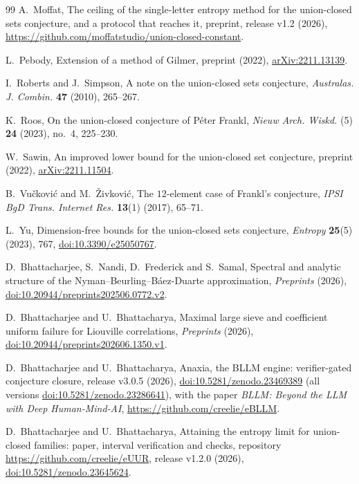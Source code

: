 \documentclass[aps,prd,twocolumn,superscriptaddress,nofootinbib,longbibliography,floatfix,amsmath,amssymb,10pt]{revtex4-2}
\theoremstyle{plain}
\theoremstyle{definition}
\theoremstyle{plain}
\begin{document}
\begin{thebibliography}{99}
 A.~Moffat, The ceiling of the single-letter entropy method for the union-closed sets conjecture, and a protocol that reaches it, preprint, release v1.2 (2026), \url{https://github.com/moffatstudio/union-closed-constant}.

 L.~Pebody, Extension of a method of Gilmer, preprint (2022), \href{https://arxiv.org/abs/2211.13139}{arXiv:2211.13139}.

 I.~Roberts and J.~Simpson, A note on the union-closed sets conjecture, \emph{Australas. J. Combin.} \textbf{47} (2010), 265--267.

 K.~Roos, On the union-closed conjecture of P\'eter Frankl, \emph{Nieuw Arch. Wiskd.} (5) \textbf{24} (2023), no.~4, 225--230.

 W.~Sawin, An improved lower bound for the union-closed set conjecture, preprint (2022), \href{https://arxiv.org/abs/2211.11504}{arXiv:2211.11504}.

 B.~Vu\v{c}kovi\'c and M.~\v{Z}ivkovi\'c, The $12$-element case of Frankl's conjecture, \emph{IPSI BgD Trans. Internet Res.} \textbf{13}(1) (2017), 65--71.

 L.~Yu, Dimension-free bounds for the union-closed sets conjecture, \emph{Entropy} \textbf{25}(5) (2023), 767, \href{https://doi.org/10.3390/e25050767}{doi:10.3390/e25050767}.

 D.~Bhattacharjee, S.~Nandi, D.~Frederick and S.~Samal, Spectral and analytic structure of the Nyman--Beurling--B\'aez-Duarte approximation, \emph{Preprints} (2026), \href{https://doi.org/10.20944/preprints202506.0772.v2}{doi:10.20944/preprints202506.0772.v2}.

 D.~Bhattacharjee and U.~Bhattacharya, Maximal large sieve and coefficient uniform failure for Liouville correlations, \emph{Preprints} (2026), \href{https://doi.org/10.20944/preprints202606.1350.v1}{doi:10.20944/preprints202606.1350.v1}.

 D.~Bhattacharjee and U.~Bhattacharya, Anaxia, the BLLM engine: verifier-gated conjecture closure, release v3.0.5 (2026), \href{https://doi.org/10.5281/zenodo.23469389}{doi:10.5281/zenodo.23469389} (all versions \href{https://doi.org/10.5281/zenodo.23286641}{doi:10.5281/zenodo.23286641}), with the paper \emph{BLLM: Beyond the LLM with Deep Human-Mind-AI}, \url{https://github.com/creelie/eBLLM}.

 D.~Bhattacharjee and U.~Bhattacharya, Attaining the entropy limit for union-closed families: paper, interval verification and checks, repository \url{https://github.com/creelie/eUUR}, release v1.2.0 (2026), \href{https://doi.org/10.5281/zenodo.23645624}{doi:10.5281/zenodo.23645624}.

\end{thebibliography}
\end{document}
